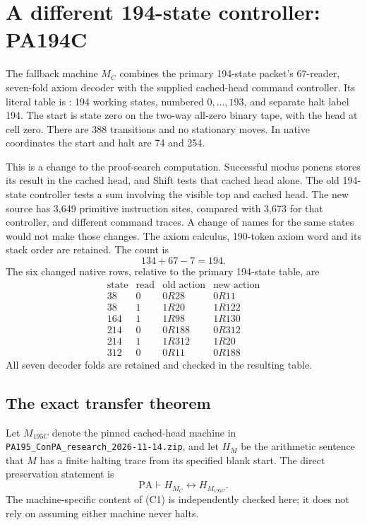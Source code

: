 \section{A different 194-state controller: PA194C}
\label{sec:pa194c}

The fallback machine $M_C$ combines the primary 194-state packet's
67-reader, seven-fold axiom decoder with the supplied cached-head command
controller. Its literal table is : 194 working
states, numbered $0,\ldots,193$, and separate halt label 194. The start is
state zero on the two-way all-zero binary tape, with the head at cell zero.
There are 388 transitions and no stationary moves. In native coordinates
the start and halt are 74 and 254.

This is a change to the proof-search computation. Successful modus ponens
stores its result in the cached head, and Shift tests that cached head
alone. The old 194-state controller tests a sum involving the visible top
and cached head. The new source has 3,649 primitive instruction sites,
compared with 3,673 for that controller, and different command traces.
A change of names for the same states would not make those changes.
The axiom calculus, 190-token axiom word and its stack order are retained.
The count is
\[
                  134+67-7=194.
\]
The six changed native rows, relative to the primary 194-state table, are
\[
\begin{array}{rr|l|l}
 \text{state}&\text{read}&\text{old action}&\text{new action}\\\hline
 38&0&0R28&0R11\\
 38&1&1R20&1R122\\
 164&1&1R98&1R130\\
 214&0&0R188&0R312\\
 214&1&1R312&1R20\\
 312&0&0R11&0R188
\end{array}
\]
All seven decoder folds are retained and checked in the resulting table.

\subsection{The exact transfer theorem}

Let $M_{195C}$ denote the pinned cached-head machine in
\texttt{PA195\_ConPA\_research\_2026-11-14.zip}, and let $H_M$ be the
arithmetic sentence that $M$ has a finite halting trace from its specified
blank start. The direct preservation statement is
\[
             \mathrm{PA}\vdash H_{M_C}\leftrightarrow H_{M_{195C}}.
\tag{C1}
\]
The machine-specific content of (C1) is independently checked here;
it does not rely on assuming either machine never halts.

